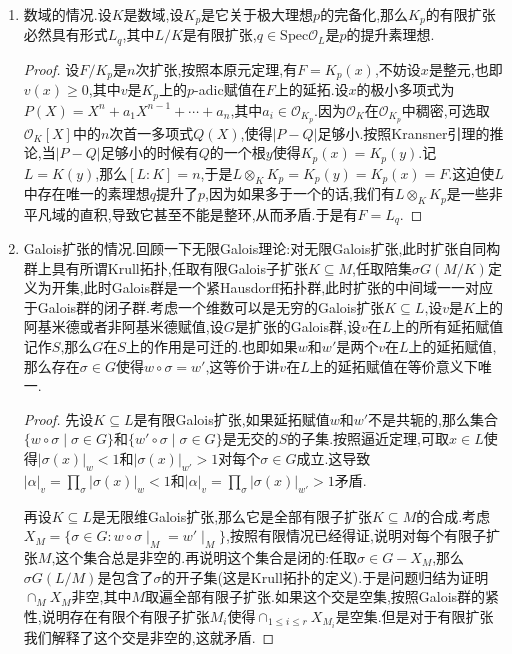 \begin{enumerate}
\begin{proof}
		按照$[L:K]=\dim_K(L)=\dim_{K_v}(L\otimes_KK_v)$,于是按照上一条证明的$K$代数同构$L\otimes_KK_v\cong\prod_{w\mid v}L_w$得到这里第一个等式.后面两个等式只要注意到数乘$\alpha$这个线性变换在$K$线性空间$L$上和在$K_v$线性空间$L\otimes_KK_v$是相同的,所以按照上一条的同构得到$p_{L/K}(x)=\prod_{w\mid v}p_{L_w/K_v}(x)$,这里$p_{L/K}$表示$\alpha$在$L/K$上的特征多项式,$p_{L_w/K_v}$同理.这个多项式等式立刻得到后两个等式.
	\end{proof}
	\item 数域的情况.设$K$是数域,设$K_p$是它关于极大理想$p$的完备化,那么$K_p$的有限扩张必然具有形式$L_q$,其中$L/K$是有限扩张,$q\in\mathrm{Spec}\mathscr{O}_L$是$p$的提升素理想.
	\begin{proof}
		
		设$F/K_p$是$n$次扩张,按照本原元定理,有$F=K_p(x)$,不妨设$x$是整元,也即$v(x)\ge0$,其中$v$是$K_p$上的$p$-adic赋值在$F$上的延拓.设$x$的极小多项式为$P(X)=X^n+a_1X^{n-1}+\cdots+a_n$,其中$a_i\in\mathscr{O}_{K_p}$.因为$\mathscr{O}_K$在$\mathscr{O}_{K_p}$中稠密,可选取$\mathscr{O}_K[X]$中的$n$次首一多项式$Q(X)$,使得$|P-Q|$足够小.按照Kransner引理的推论,当$|P-Q|$足够小的时候有$Q$的一个根$y$使得$K_p(x)=K_p(y)$.记$L=K(y)$,那么$[L:K]=n$,于是$L\otimes_KK_p=K_p(y)=K_p(x)=F$.这迫使$L$中存在唯一的素理想$q$提升了$p$,因为如果多于一个的话,我们有$L\otimes_KK_p$是一些非平凡域的直积,导致它甚至不能是整环,从而矛盾.于是有$F=L_q$.
	\end{proof}
    \item Galois扩张的情况.回顾一下无限Galois理论:对无限Galois扩张,此时扩张自同构群上具有所谓Krull拓扑,任取有限Galois子扩张$K\subseteq M$,任取陪集$\sigma G(M/K)$定义为开集,此时Galois群是一个紧Hausdorff拓扑群,此时扩张的中间域一一对应于Galois群的闭子群.考虑一个维数可以是无穷的Galois扩张$K\subseteq L$,设$v$是$K$上的阿基米德或者非阿基米德赋值,设$G$是扩张的Galois群,设$v$在$L$上的所有延拓赋值记作$S$,那么$G$在$S$上的作用是可迁的.也即如果$w$和$w'$是两个$v$在$L$上的延拓赋值,那么存在$\sigma\in G$使得$w\circ\sigma=w'$,这等价于讲$v$在$L$上的延拓赋值在等价意义下唯一.
    \begin{proof}
    	
    	先设$K\subseteq L$是有限Galois扩张,如果延拓赋值$w$和$w'$不是共轭的,那么集合$\{w\circ\sigma\mid\sigma\in G\}$和$\{w'\circ\sigma\mid\sigma\in G\}$是无交的$S$的子集.按照逼近定理,可取$x\in L$使得$|\sigma(x)|_w<1$和$|\sigma(x)|_{w'}>1$对每个$\sigma\in G$成立.这导致$|\alpha|_v=\prod_{\sigma}|\sigma(x)|_w<1$和$|\alpha|_v=\prod_{\sigma}|\sigma(x)|_{w'}>1$矛盾.
    	
    	再设$K\subseteq L$是无限维Galois扩张,那么它是全部有限子扩张$K\subseteq M$的合成.考虑$X_M=\{\sigma\in G: w\circ\sigma\mid_M=w'\mid_M\}$,按照有限情况已经得证,说明对每个有限子扩张$M$,这个集合总是非空的.再说明这个集合是闭的:任取$\sigma\in G-X_M$,那么$\sigma G(L/M)$是包含了$\sigma$的开子集(这是Krull拓扑的定义).于是问题归结为证明$\cap_MX_M$非空,其中$M$取遍全部有限子扩张.如果这个交是空集,按照Galois群的紧性,说明存在有限个有限子扩张$M_i$使得$\cap_{1\le i\le r}X_{M_i}$是空集.但是对于有限扩张我们解释了这个交是非空的,这就矛盾.
    \end{proof}
\end{enumerate}

